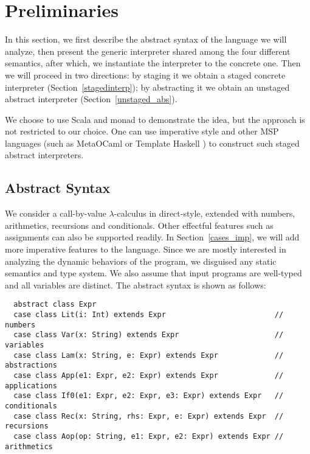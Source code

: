 \newcommand{\TLang}{$L_\lambda$}

\section{Preliminaries}

In this section, we first describe the abstract syntax of the language we will
analyze, then present the generic interpreter shared among the four different
semantics, after which, we instantiate the interpreter to the concrete one. Then we
will proceed in two directions: by staging it we obtain a staged concrete interpreter
(Section~\ref{stagedinterp}); by abstracting it we obtain an unstaged abstract
interpreter (Section~\ref{unstaged_abs}).

We choose to use Scala and monad to demonstrate the idea, but the approach
is not restricted to our choice. One can use imperative style and other MSP languages 
(such as MetaOCaml \cite{DBLP:conf/gpce/CalcagnoTHL03, DBLP:conf/flops/Kiselyov14} 
or Template Haskell \cite{Sheard:2002:TMH:636517.636528} )
to construct such staged abstract interpreters.

\subsection{Abstract Syntax} \label{bg_lang}

We consider a call-by-value $\lambda$-calculus in direct-style, extended
with numbers, arithmetics, recursions and conditionals. Other effectful features
such as assignments can also be supported readily. In Section~\ref{cases_imp}, we
will add more imperative features to the language. Since we are mostly
interested in analyzing the dynamic behaviors of the program, we disguised any
static semantics and type system. We also assume that input programs are
well-typed and all variables are distinct. The abstract syntax is shown as
follows:

\begin{lstlisting}
  abstract class Expr
  case class Lit(i: Int) extends Expr                         // numbers
  case class Var(x: String) extends Expr                      // variables
  case class Lam(x: String, e: Expr) extends Expr             // abstractions
  case class App(e1: Expr, e2: Expr) extends Expr             // applications
  case class If0(e1: Expr, e2: Expr, e3: Expr) extends Expr   // conditionals
  case class Rec(x: String, rhs: Expr, e: Expr) extends Expr  // recursions
  case class Aop(op: String, e1: Expr, e2: Expr) extends Expr // arithmetics
\end{lstlisting}

